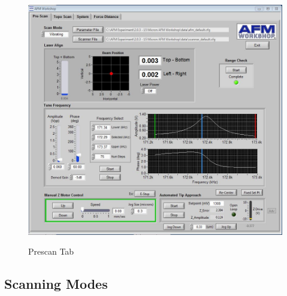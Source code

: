 \documentclass{../lab}
\begin{document}
\begin{figure}[H]
    \centering
    \href{http://experimentationlab.berkeley.edu/sites/default/files/AFMImages/prescantab.JPG}{\includegraphics[width=0.8\linewidth]{images/prescantab.JPG}}
    \label{fig:prescantab}
    \caption{Prescan Tab}
\end{figure}

\subsection{Scanning Modes}
\end{document}
